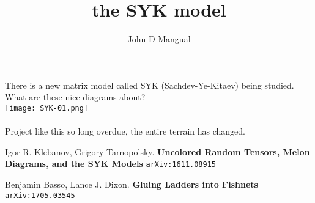 \documentclass[12pt]{article}
\title{the SYK model}
\author{John D Mangual}
\date{}
\begin{document}
\selectfont \fontsize{12.5}{15}\selectfont

\maketitle

\noindent There is a new matrix model called SYK (Sachdev-Ye-Kitaev) being studied.  What are these nice diagrams about?  \\ 
\texttt{[image: SYK-01.png]} \\ \\
Project like this so long overdue, the entire terrain has changed.

\vfill

\begin{thebibliography}{}

\item Igor R. Klebanov, Grigory Tarnopolsky. \textbf{Uncolored Random Tensors, Melon Diagrams, and the SYK Models} \texttt{arXiv:1611.08915}

\item Benjamin Basso, Lance J. Dixon. \textbf{Gluing Ladders into Fishnets} \texttt{arXiv:1705.03545}

\end{thebibliography}
\end{document}
